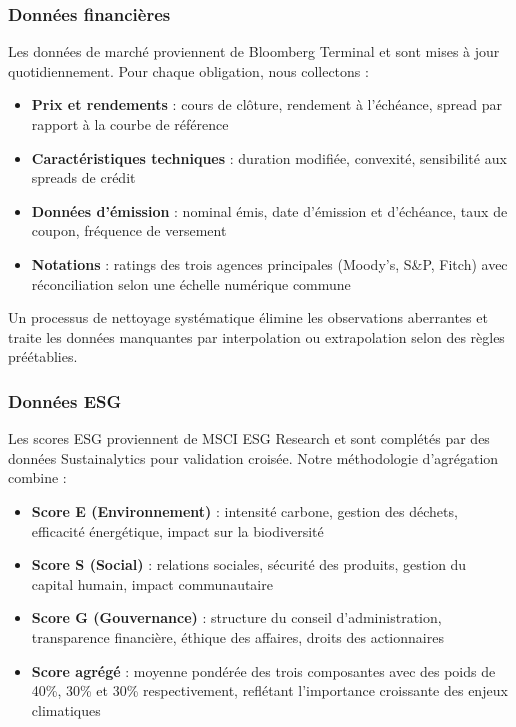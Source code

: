 \subsubsection{Données financières}

Les données de marché proviennent de Bloomberg Terminal et sont mises à jour quotidiennement. Pour chaque obligation, nous collectons :

\begin{itemize}
    \item \textbf{Prix et rendements} : cours de clôture, rendement à l'échéance, spread par rapport à la courbe de référence
    \item \textbf{Caractéristiques techniques} : duration modifiée, convexité, sensibilité aux spreads de crédit
    \item \textbf{Données d'émission} : nominal émis, date d'émission et d'échéance, taux de coupon, fréquence de versement
    \item \textbf{Notations} : ratings des trois agences principales (Moody's, S\&P, Fitch) avec réconciliation selon une échelle numérique commune
\end{itemize}

Un processus de nettoyage systématique élimine les observations aberrantes et traite les données manquantes par interpolation ou extrapolation selon des règles préétablies.

\subsubsection{Données ESG}

Les scores ESG proviennent de MSCI ESG Research et sont complétés par des données Sustainalytics pour validation croisée. Notre méthodologie d'agrégation combine :

\begin{itemize}
    \item \textbf{Score E (Environnement)} : intensité carbone, gestion des déchets, efficacité énergétique, impact sur la biodiversité
    \item \textbf{Score S (Social)} : relations sociales, sécurité des produits, gestion du capital humain, impact communautaire
    \item \textbf{Score G (Gouvernance)} : structure du conseil d'administration, transparence financière, éthique des affaires, droits des actionnaires
    \item \textbf{Score agrégé} : moyenne pondérée des trois composantes avec des poids de 40\%, 30\% et 30\% respectivement, reflétant l'importance croissante des enjeux climatiques
\end{itemize}

